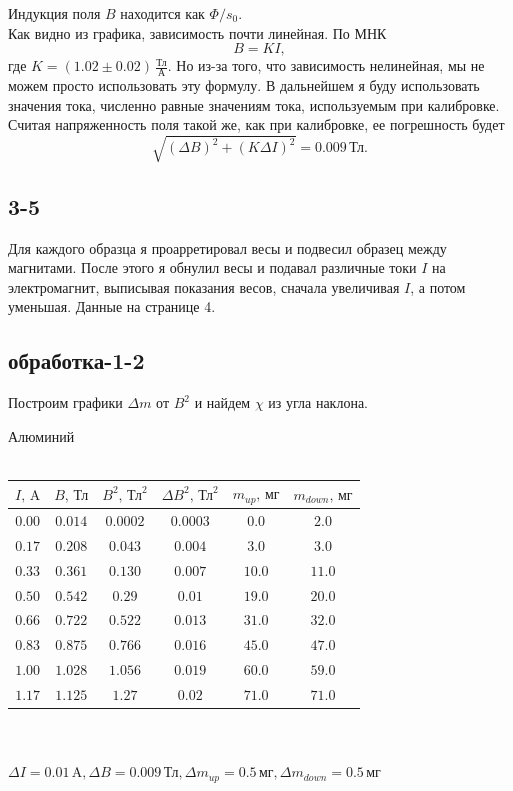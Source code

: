 \documentclass[a4paper,12pt]{article}
\begin{document}
Индукция поля $B$ находится как $\Phi/s_0$.\\
Как видно из графика, зависимость почти линейная. По МНК
$$B = K I,$$
где $K = (1.02\pm0.02)\,\frac{\text{Тл}}{\text{А}}$.
Но из-за того, что зависимость нелинейная, мы не можем просто использовать эту формулу. В дальнейшем я буду использовать значения тока, численно равные значениям тока, используемым при калибровке. Считая напряженность поля такой же, как при калибровке, ее погрешность будет
$$\sqrt{(\Delta B)^2 + (K \Delta{I})^2} = 0.009\,\text{Тл}.$$

\subsection*{3-5}
Для каждого образца я проарретировал весы и подвесил образец между магнитами. После этого я обнулил весы и подавал различные токи $I$ на электромагнит, выписывая показания весов, сначала увеличивая $I$, а потом уменьшая. Данные на странице 4.

\newpage
\subsection*{обработка-1-2}
Построим графики $\Delta m$ от $B^2$ и найдем $\chi$ из угла наклона.

\begin{center}
Алюминий\\~\\
\begin{tabular}{|c|c|c|c|c|c|}\hline
$I\text{, A}$&$B\text{, Тл}$&$B^2\text{, Тл}^2$&$\Delta B^2\text{, Тл}^2$&$m_{up}\text{, мг}$&$m_{down}\text{, мг}$\\\hline
$0.00$&$0.014$&$0.0002$&$0.0003$&$0.0$&$2.0$\\\hline
$0.17$&$0.208$&$0.043$&$0.004$&$3.0$&$3.0$\\\hline
$0.33$&$0.361$&$0.130$&$0.007$&$10.0$&$11.0$\\\hline
$0.50$&$0.542$&$0.29$&$0.01$&$19.0$&$20.0$\\\hline
$0.66$&$0.722$&$0.522$&$0.013$&$31.0$&$32.0$\\\hline
$0.83$&$0.875$&$0.766$&$0.016$&$45.0$&$47.0$\\\hline
$1.00$&$1.028$&$1.056$&$0.019$&$60.0$&$59.0$\\\hline
$1.17$&$1.125$&$1.27$&$0.02$&$71.0$&$71.0$\\\hline
\end{tabular}\\~\\
$\Delta I=0.01\,\text{A}, \Delta B=0.009\,\text{Тл}, \Delta m_{up}=0.5\,\text{мг}, \Delta m_{down}=0.5\,\text{мг}$
\end{center}
\end{document}

